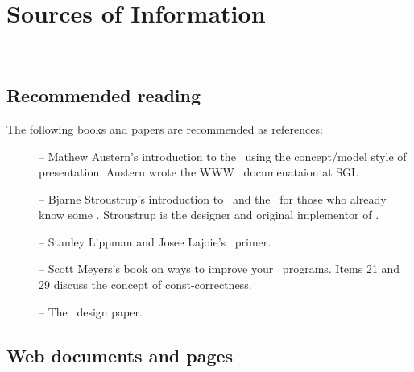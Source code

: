 
\chapter{Sources of Information}
\label{chap:info}
 \\

\section{Recommended reading}
\label{sec:recommended_reading}

The following books and papers are recommended as references:

\begin{description}
   \item[\cite{Austern98}] --  Mathew Austern's introduction to the \stl\ 
        using the concept/model style of presentation.  Austern wrote the 
        WWW \stl\ documenataion at SGI.

   \item[\cite{Stroustrup97}] -- Bjarne Stroustrup's introduction to
        \CC\ and the \stl\ for those who already know some \CC. 
        Stroustrup is the designer and original implementor of \CC.

   \item[\cite{Lippman98}] -- Stanley Lippman and Josee Lajoie's \CC\ primer.

   \item[\cite{Meyers97}] -- Scott Meyers's book on ways to improve
        your \CC\ programs.  Items 21 and 29 discuss the concept of 
        const-correctness.

  \item [\cite{Fabri98}] -- The \cgal\ design paper. 
\end{description}

\section{Web documents and pages}
\label{sec:web_pages}

